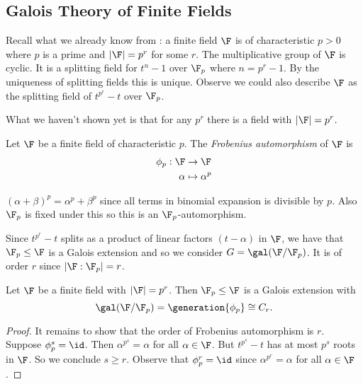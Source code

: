 \documentclass[a4paper]{article}
\begin{document}
\subsection{Galois Theory of Finite Fields}

Recall what we already know from : a finite field \(\F\) is of characteristic \(p > 0\) where \(p\) is a prime and \(|\F| = p^r\) for some \(r\). The multiplicative group of \(\F\) is cyclic. It is a splitting field for \(t^n - 1\) over \(\F_p\) where \(n = p^r - 1\). By the uniqueness of splitting fields this is unique. Observe we could also describe \(\F\) as the splitting field of \(t^{p^r} - t\) over \(\F_p\).

What we haven't shown yet is that for any \(p^r\) there is a field with \(|\F| = p^r\).

\begin{definition}
  Let \(\F\) be a finite field of characteristic \(p\). The \emph{Frobenius automorphism} of \(\F\) is
  \begin{align*}
    \phi_p: \F &\to \F \\
    \alpha &\mapsto \alpha^p
  \end{align*}
\end{definition}

\begin{remark}
  \((\alpha + \beta)^p = \alpha^p + \beta^p\) since all terms in binomial expansion is divisible by \(p\). Also \(\F_p\) is fixed under this so this is an \(\F_p\)-automorphism.
\end{remark}

Since \(t^{p^r} - t\) splits as a product of linear factors \((t - \alpha)\) in \(\F\), we have that \(\F_p \leq \F\) is a Galois extension and so we consider \(G = \gal(\F/\F_p)\). It is of order \(r\) since \(|\F:\F_p| = r\).

\begin{theorem}
  Let \(\F\) be a finite field with \(|\F| = p^r\). Then \(\F_p \leq \F\) is a Galois extension with
  \[
    \gal(\F/\F_p) = \generation{\phi_p} \cong C_r.
  \]
\end{theorem}

\begin{proof}
  It remains to show that the order of Frobenius automorphism is \(r\). Suppose \(\phi_p^s = \id\). Then \(\alpha^{p^s} = \alpha\) for all \(\alpha \in \F\). But \(t^{p^s} - t\) has at most \(p^s\) roots in \(\F\). So we conclude \(s \geq r\). Observe that \(\phi_p^r = \id\) since \(\alpha^{p^r} = \alpha\) for all \(\alpha \in \F\).
\end{proof}
\end{document}

